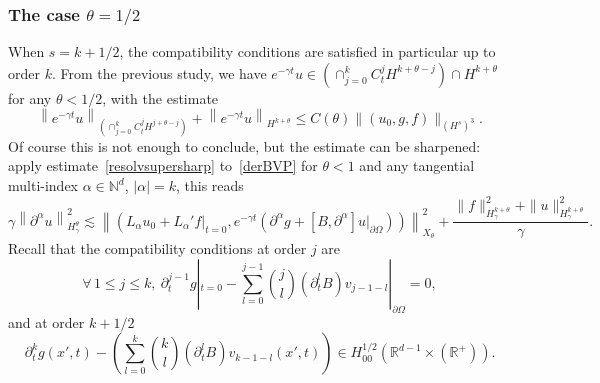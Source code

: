 \documentclass[10pt]{amsart}
\theoremstyle{definition}\newtheorem{defi}[theo]{Definition}\newtheorem{rema}[theo]{Remark}\newtheorem{exam}[theo]{Example}\newtheorem{exem}[theo]{Example}\newtheorem{nota}[theo]{Notation}
\newcommand{\R}{\mathbb{R}}
\newcommand{\N}{\mathbb{N}}
\newcommand{\clA}{\mathcal{A}}
\let\oldforall\forall
\renewcommand*{\forall}{\mathrel{\oldforall}}
\begin{document}
\subsubsection{The case $\theta=1/2$}\label{cas1/2}
When $s=k+1/2$, the compatibility conditions are satisfied in particular up to order $k$. From the previous study, we have $e^{-\gamma t}u\in (\cap_{j=0}^k C_t^jH^{k+\theta-j})\cap H^{k+\theta}$ for any $\theta<1/2$, with the estimate
\[
\left\|e^{-\gamma t}u\right\|_{\left(\cap_{j=0}^k C_t^jH^{j+\theta-j}\right)} +\left\|e^{-\gamma t}u\right\|_{H^{k+\theta}}
\leq C(\theta)\|(u_0,g,f)\|_{(H^s)^3}.
\]
Of course this is not enough to conclude, but the estimate can be sharpened: apply estimate~\eqref{resolvsupersharp} to~\eqref{derBVP} for $\theta<1$ and any tangential multi-index $\alpha\in \N^d$, $|\alpha|=k$, this reads
\[
\gamma\left\|\partial^\alpha u\right\|_{H^\theta_\gamma}^2 \lesssim \left\|\left(L_\alpha u_{0}+L_\alpha'f|_{t=0},e^{-\gamma t}\left(\partial^\alpha g+\left[B,\partial^\alpha\right]u|_{\partial\Omega}\right)\right)\right\|_{X_\theta}^2 +\frac{\|f\|_{H^{k+\theta}_\gamma}^2+
\|u\|^2_{H^{k+\theta}_\gamma}}{\gamma}.
\]
Recall that the compatibility conditions at order $j$ are
\[
\forall\,1\leq j\leq k,\
\partial_t^{j-1}g|_{t=0}-\sum_{l=0}^{j-1}
\binom{j}{l}\left(\partial_t^lB\right)v_{j-1-l}|_{\partial\Omega}=0,
\]
and at order $k+1/2$
\begin{equation*}
\partial_t^{k}g(x',t)-\left(\sum_{l=0}^{k}
\binom{k}{l}\left(\partial_t^lB\right)v_{k-1-l}(x',t)\right)
\in H^{1/2}_{00}\left(\R^{d-1}\times (\R^+)\right).
\end{equation*}

\end{document}
